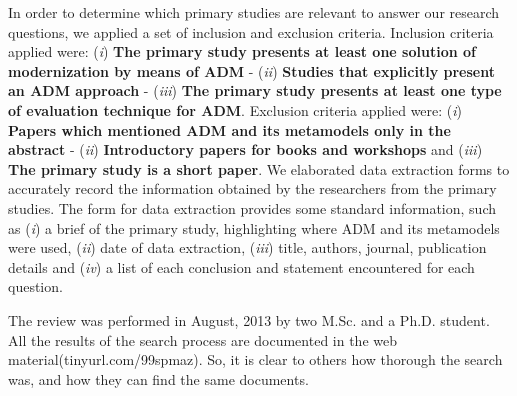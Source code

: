 In order to determine which primary studies are relevant to answer our research questions, we applied a set of inclusion and exclusion criteria. Inclusion criteria applied were: (\textit{i}) \textbf{The primary study presents at least one solution of modernization by means of ADM} - (\textit{ii}) \textbf{Studies that explicitly present an ADM approach} - (\textit{iii}) \textbf{The primary study presents at least one type of evaluation technique for ADM}. 
Exclusion criteria applied were: (\textit{i}) \textbf{Papers which mentioned ADM and its metamodels only in the abstract} - (\textit{ii}) \textbf{Introductory papers for books and workshops} and (\textit{iii}) \textbf{The primary study is a short paper}. We elaborated data extraction forms to accurately record the information obtained by the researchers from the primary studies. The form for data extraction provides some standard information, such as (\textit{i}) a brief of the primary study, highlighting where ADM and its metamodels were used, (\textit{ii}) date of data extraction, (\textit{iii}) title, authors, journal, publication details and (\textit{iv}) a list of each conclusion and statement encountered for each question. 


The review was performed in August, 2013 by two M.Sc. and a Ph.D. student. All the results of the search process are documented in the web material(tinyurl.com/99spmaz). So, it is clear to others how thorough the search was, and how they can find the same documents.
